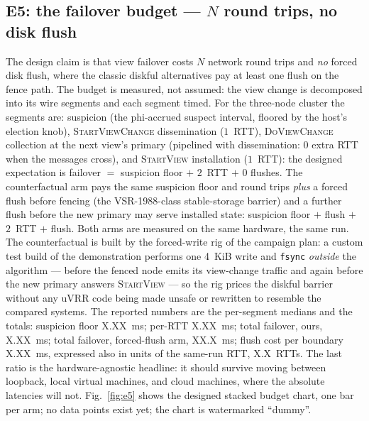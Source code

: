 \documentclass[10pt,journal,letterpaper]{IEEEtran}
\newcommand{\code}[1]{\texttt{#1}}
\begin{document}
\subsection{E5: the failover budget --- $N$ round trips, no disk flush}
The design claim is that view failover costs $N$ network round trips and
\emph{no} forced disk flush, where the classic diskful alternatives pay at
least one flush on the fence path. The budget is measured, not assumed: the
view change is decomposed into its wire segments and each segment timed.
For the three-node cluster the segments are: suspicion (the phi-accrued
suspect interval, floored by the host's election knob),
\textsc{StartViewChange} dissemination ($1$~RTT), \textsc{DoViewChange}
collection at the next view's primary (pipelined with dissemination:
$0$ extra RTT when the messages cross), and \textsc{StartView} installation
($1$~RTT): the designed expectation is failover $=$ suspicion floor $+$
$2$~RTT $+$ $0$ flushes. The counterfactual arm pays the same suspicion
floor and round trips \emph{plus} a forced flush before fencing (the
VSR-1988-class stable-storage barrier) and a further flush before the new
primary may serve installed state: suspicion floor $+$ flush $+$ $2$~RTT
$+$ flush. Both arms are measured on the same hardware, the same run.
The counterfactual is built by the forced-write rig of the campaign plan:
a custom test build of the demonstration performs one 4~KiB write and
\code{fsync} \emph{outside} the algorithm --- before the fenced node emits
its view-change traffic and again before the new primary answers
\textsc{StartView} --- so the rig prices the diskful barrier without any
uVRR code being made unsafe or rewritten to resemble the compared systems.
The reported numbers are the per-segment medians and the totals: suspicion
floor X.XX~ms; per-RTT X.XX~ms; total failover, ours, X.XX~ms; total
failover, forced-flush arm, XX.X~ms; flush cost per boundary X.XX~ms,
expressed also in units of the same-run RTT, X.X~RTTs. The last ratio is
the hardware-agnostic headline: it should survive moving between loopback,
local virtual machines, and cloud machines, where the absolute latencies
will not. Fig.~\ref{fig:e5} shows the designed stacked budget chart, one
bar per arm; no data points exist yet; the chart is watermarked ``dummy''.
\end{document}
